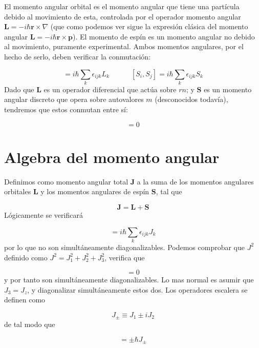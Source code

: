 \documentclass[12pt,a4paper]{book}
\numberwithin{equation}{chapter}
\numberwithin{figure}{chapter}
\newcommand{\tquad}{\quad \quad \quad}
\newcommand{\rn}{\mathbf{r}}
\newcommand{\pn}{\mathbf{p}}
\newcommand{\Sn}{\mathbf{S}}
\newcommand{\Ln}{\mathbf{L}}
\newcommand{\Jn}{\mathbf{J}}
\begin{document}
El momento angular orbital es el momento angular que tiene una partícula debido al movimiento de esta, controlada por el operador momento angular $\Ln = - i \hbar \rn \times \nabla$ (que como podemos ver sigue la expresión clásica del momento angular $\Ln=-i\hbar \rn \times \pn$). El momento de espín es un momento angular no debido al movimiento, puramente experimental. Ambos momentos angulares, por el hecho de serlo, deben verificar la conmutación:

\begin{equation}
[L_i,L_j]=i \hbar \sum_k \epsilon_{ijk} L_k \tquad
[S_i,S_j]=i \hbar \sum_k \epsilon_{ijk} S_k
\end{equation}
Dado que $\Ln$ es un operador diferencial que actúa sobre $rn$; y $\Sn$ es un momento angular discreto que opera sobre autovalores $m$ (desconocidos todavía), tendremos que estos conmutan entre sí:

\begin{equation}
[L_i,S_j] = 0
\end{equation}

\section{Algebra  del momento angular}

Definimos como momento angular total $\Jn$ a la suma de los momentos angulares orbitales $\Ln$ y los momentos angulares de espín $\Sn$, tal que

\begin{equation}
\Jn = \Ln + \Sn
\end{equation}
Lógicamente se verificará 

\begin{equation}
[J_i,J_j] = i \hbar \sum_k \epsilon_{ijk} J_k
\end{equation}
por lo que no son simultáneamente diagonalizables. Podemos comprobar que $J^2$ definido como $J^2 = J_1^2+J_2^2+J_3^2$, verifica que

\begin{equation}
[J^2,J_i]=0
\end{equation}
y por tanto son simultáneamente diagonalizables. Lo mas normal es asumir que $J_3=J_z$, y diagonalizar simultáneamente estos dos. Los operadores escalera se definen como

\begin{equation}
J_\pm \equiv J_1 \pm i J_2
\end{equation}
de tal modo que

\begin{equation}
[J_3,J_{\pm}] = \pm \hbar J_\pm
\end{equation}
\end{document}
